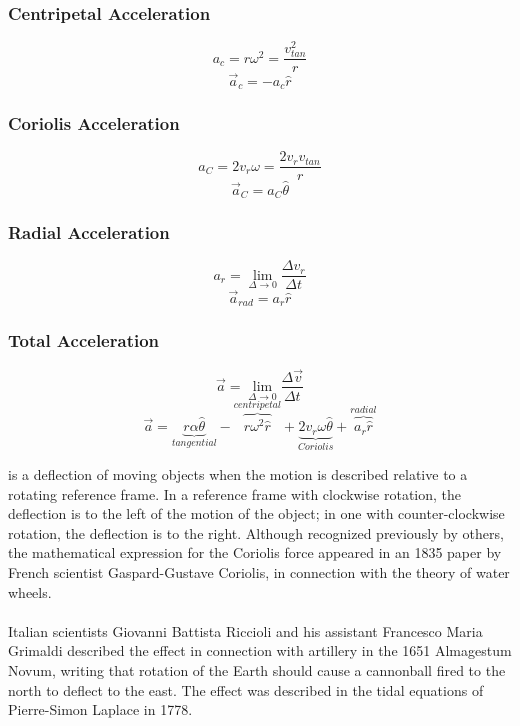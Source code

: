 \subsubsection{Centripetal Acceleration}
$$a_{c}=r\omega^2=\frac{v^2_{tan}}{r}$$
$$\overrightarrow{a}_{c}=-a_{c}\hat{r}$$
\subsubsection{Coriolis Acceleration}
$$a_{C}=2v_r\omega=\frac{2v_r v_{tan}}{r}$$
$$\overrightarrow{a}_{C}=a_{C}\hat{\theta}$$
\subsubsection{Radial Acceleration}
$$a_r=\lim_{\Delta \rightarrow 0}\frac{\Delta v_r}{\Delta t}$$
$$\overrightarrow{a}_{rad}=a_r\hat{r}$$

\subsubsection{Total Acceleration}
$$\overrightarrow{a}=\lim_{\Delta \rightarrow 0}\frac{\Delta \overrightarrow{v}}{\Delta t}$$
$$\overrightarrow{a}=\underbrace{r\alpha\hat{\theta}}_{\textit{tangential}}-\overbrace{r\omega^2\hat{r}}^{\textit{centripetal}}+\underbrace{2v_r\omega\hat{\theta}}_{\textit{Coriolis}}+\overbrace{a_r\hat{r}}^{\textit{radial}}$$

\vspace{1cm}

\begin{fullwidth}
 is a deflection of moving objects when the motion is described relative to a rotating reference frame. In a reference frame with clockwise rotation, the deflection is to the left of the motion of the object; in one with counter-clockwise rotation, the deflection is to the right. Although recognized previously by others, the mathematical expression for the Coriolis force appeared in an 1835 paper by French scientist Gaspard-Gustave Coriolis, in connection with the theory of water wheels.\\ \ \\

Italian scientists Giovanni Battista Riccioli and his assistant Francesco Maria Grimaldi described the effect in connection with artillery in the 1651 Almagestum Novum, writing that rotation of the Earth should cause a cannonball fired to the north to deflect to the east. The effect was described in the tidal equations of Pierre-Simon Laplace in 1778.
\end{fullwidth}

